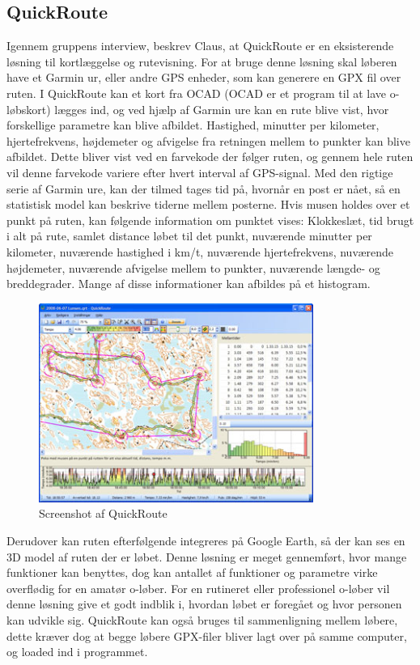 \subsection{QuickRoute}
Igennem gruppens interview, beskrev Claus, at QuickRoute er en eksisterende løsning til kortlæggelse og rutevisning. For at bruge denne løsning skal løberen have et Garmin ur, eller andre GPS enheder, som kan generere en GPX fil over ruten. I QuickRoute kan et kort fra OCAD (OCAD er et program til at lave o-løbskort) lægges ind, og ved hjælp af Garmin ure kan en rute blive vist, hvor forskellige parametre kan blive afbildet. Hastighed, minutter per kilometer, hjertefrekvens, højdemeter og afvigelse fra retningen mellem to punkter kan blive afbildet. Dette bliver vist ved en farvekode der følger ruten, og gennem hele ruten vil denne farvekode variere efter hvert interval af GPS-signal. Med den rigtige serie af Garmin ure, kan der tilmed tages tid på, hvornår en post er nået, så en statistisk model kan beskrive tiderne mellem posterne. Hvis musen holdes over et punkt på ruten, kan følgende information om punktet vises: Klokkeslæt, tid brugt i alt på rute, samlet distance løbet til det punkt, nuværende minutter per kilometer, nuværende hastighed i km/t, nuværende hjertefrekvens, nuværende højdemeter, nuværende afvigelse mellem to punkter, nuværende længde- og breddegrader. Mange af disse informationer kan afbildes på et histogram. \citep{QR}

\begin{figure}[h]
	\centering
	\includegraphics[width=0.8\textwidth]{billeder/QR}
	\caption{Screenshot af QuickRoute}
\end{figure}

Derudover kan ruten efterfølgende integreres på Google Earth, så der kan ses en 3D model af ruten der er løbet. 
Denne løsning er meget gennemført, hvor mange funktioner kan benyttes, dog kan antallet af funktioner og parametre virke overflødig for en amatør o-løber. For en rutineret eller professionel o-løber vil denne løsning give et godt indblik i, hvordan løbet er foregået og hvor personen kan udvikle sig. QuickRoute kan også bruges til sammenligning mellem løbere, dette kræver dog at begge løbere GPX-filer bliver lagt over på samme computer, og loaded ind i programmet. 


